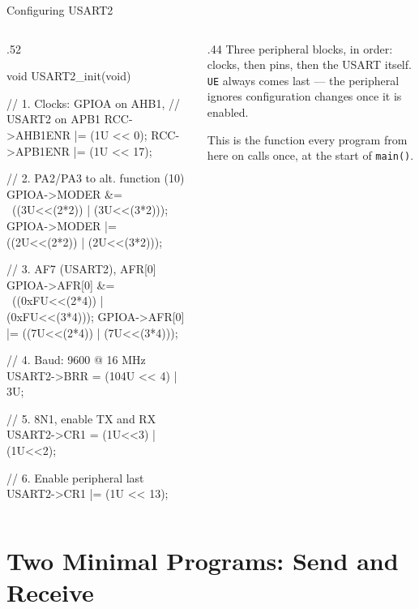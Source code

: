\documentclass[9pt,aspectratio=169,xcolor=table]{beamer}
\begin{document}
\begin{frame}[fragile]{Configuring USART2}
    \begin{columns}[c]
    \begin{column}{.52\textwidth}
        \begin{cc}[basicstyle=\scriptsize\ttfamily]
void USART2_init(void) {
  // 1. Clocks: GPIOA on AHB1,
  //    USART2 on APB1
  RCC->AHB1ENR |= (1U << 0);
  RCC->APB1ENR |= (1U << 17);

  // 2. PA2/PA3 to alt. function (10)
  GPIOA->MODER &=  ~((3U<<(2*2)) | (3U<<(3*2)));
  GPIOA->MODER |=  ((2U<<(2*2)) | (2U<<(3*2)));

  // 3. AF7 (USART2), AFR[0]
  GPIOA->AFR[0] &= ~((0xFU<<(2*4)) | (0xFU<<(3*4)));
  GPIOA->AFR[0] |=  ((7U<<(2*4)) | (7U<<(3*4)));

  // 4. Baud: 9600 @ 16 MHz
  USART2->BRR = (104U << 4) | 3U;

  // 5. 8N1, enable TX and RX
  USART2->CR1 = (1U<<3) | (1U<<2);

  // 6. Enable peripheral last
  USART2->CR1 |= (1U << 13);
}
    \end{cc}
    \end{column}
    \begin{column}{.44\textwidth}
        {\small Three peripheral blocks, in order: \alert{clocks}, then
        \alert{pins}, then the \alert{USART} itself. \texttt{UE} always comes
        last --- the peripheral ignores configuration changes once it is
        enabled.}

        \vspace{2mm}
        {\small This is the function every program from here on calls once,
        at the start of \texttt{main()}.}
    \end{column}
    \end{columns}
\end{frame}


\section{Two Minimal Programs: Send and Receive}
\end{document}
